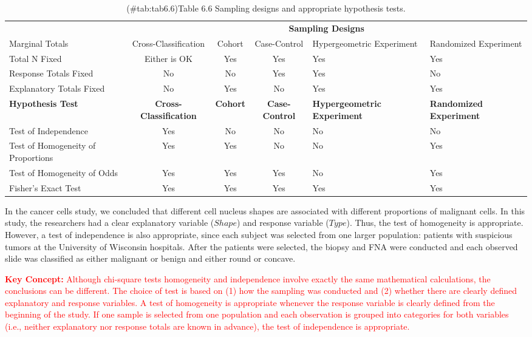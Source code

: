 \documentclass[
]{report}
\begin{document}
\begin{table}[!h]
\centering
\caption{(\#tab:tab6.6)Table 6.6 Sampling designs and appropriate hypothesis tests.}
\centering
\begin{tabular}[t]{>{\raggedright\arraybackslash}p{2cm}ccc>{\centering\arraybackslash}p{3cm}>{\centering\arraybackslash}p{2.5cm}}
\toprule
\multicolumn{1}{c}{\textbf{ }} & \multicolumn{5}{c}{\textbf{Sampling Designs}} \\
\cmidrule(l{3pt}r{3pt}){2-6}
Marginal Totals & Cross-Classification & Cohort & Case-Control & Hypergeometric Experiment & Randomized Experiment\\
\midrule
Total N Fixed & Either is OK & Yes & Yes & Yes & Yes\\
Response Totals Fixed & No & No & Yes & Yes & No\\
Explanatory Totals Fixed & No & Yes & No & Yes & Yes\\
\textbf{Hypothesis Test} & \textbf{Cross-Classification} & \textbf{Cohort} & \textbf{Case-Control} & \textbf{Hypergeometric Experiment} & \textbf{Randomized Experiment}\\
Test of Independence & Yes & No & No & No & No\\
\addlinespace
Test of Homogeneity of Proportions & Yes & Yes & No & No & Yes\\
Test of Homogeneity of Odds & Yes & Yes & Yes & No & Yes\\
Fisher's Exact Test & Yes & Yes & Yes & Yes & Yes\\
\bottomrule
\end{tabular}
\end{table}

In the cancer cells study, we concluded that different cell nucleus shapes are associated with different
proportions of malignant cells. In this study, the researchers had a clear explanatory variable (\(Shape\)) and
response variable (\(Type\)). Thus, the test of homogeneity is appropriate. However, a test of independence is
also appropriate, since each subject was selected from one larger population: patients with suspicious tumors
at the University of Wisconsin hospitals. After the patients were selected, the biopsy and FNA were conducted
and each observed slide was classified as either malignant or benign and either round or concave.

\Large

\textbf{\textcolor{red}{Key Concept:}}
\textcolor{red}{Although chi-square tests homogeneity and independence involve exactly the same mathematical calculations, the conclusions can be different. The choice of test is based on (1) how the sampling was conducted and (2) whether there are clearly defined explanatory and response variables. A test of homogeneity is appropriate whenever the response variable is clearly defined from the beginning of the study. If one sample is selected from one population and each observation is grouped into categories for both variables (i.e., neither explanatory nor response totals are known in advance), the test of independence is appropriate.}
\normalsize
\end{document}
